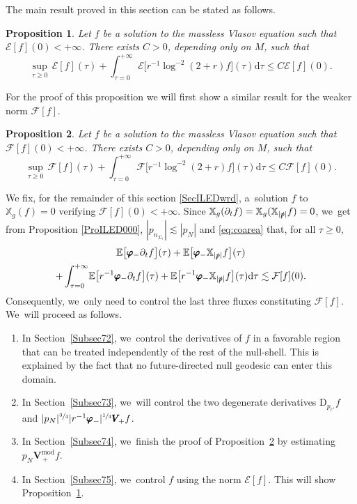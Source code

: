 \documentclass[10pt]{amsart}
\theoremstyle{plain}
\newtheorem{proposition}{Proposition}[section]
\theoremstyle{definition}
\newcommand\T{{\mathbb{X}}}
\newcommand\dr{{\mathrm{d}}}
\begin{document}
The main result proved in this section can be stated as follows.

\begin{proposition}\label{ProILEDwrd2}
Let $f $ be a solution to the massless Vlasov equation such that $\mathcal{E}[f](0) <+ \infty$. There exists $C>0$, depending only on $M$, such that
\[
\sup_{\tau \geq 0} \, \mathcal{E}[f](\tau) +\int_{\tau=0}^{+\infty} \mathcal{E}\bigl[r^{-1}\log^{-2}(2+r)f \bigr](\tau) \dr \tau \leq C \mathcal{E}[f](0).
\]
\end{proposition}

For the proof of this proposition we will first show a similar result for the weaker norm $\mathcal{F}[f]$.

\begin{proposition}\label{ProILEDwrd}
Let $f $ be a solution to the massless Vlasov equation such that $\mathcal{F}[f](0) <+ \infty$. There exists $C>0$, depending only on $M$, such that
\[
\sup_{\tau \geq 0} \, \mathcal{F}[f](\tau) +\int_{\tau=0}^{+\infty} \mathcal{F}\bigl[r^{-1}\log^{-2}(2+r)f \bigr](\tau) \dr \tau \leq C \mathcal{F}[f](0).
\]
\end{proposition}

We fix, for the remainder of this section \ref{SecILEDwrd}, a~solution $f$ to $\T_g(f)=0$ verifying $\mathcal{F}[f](0)<+\infty$. Since $\T_g(\partial_t f)=\T_g(\T_{|\slashed{p}|}f)=0$, we~get from Proposition \ref{ProILED000}, $|p_{n_{\Sigma_\tau}}| \lesssim |p_N|$ and \eqref{eq:coarea} that, for all $\tau \geq 0$,
\begin{multline}\label{kevatalenn:0}
\mathbb{E}\bigl[ \pmb{\varphi}_- \partial_t f \bigr](\tau)+\mathbb{E}\bigl[ \pmb{\varphi}_- \T_{|\slashed{p}|} f \bigr](\tau) \\
+ \int_{\tau=0}^{+\infty} \! \mathbb{E}\bigl[ r^{-1} \pmb{\varphi}_- \partial_t f \bigr](\tau)+\mathbb{E}\bigl[r^{-1} \pmb{\varphi}_- \T_{|\slashed{p}|} f \bigr](\tau) \dr \tau \lesssim \mathcal{F}[f](0).
\end{multline}
Consequently, we~only need to control the last three fluxes constituting $\mathcal{F}[f]$. We~will proceed as follows.
\begin{enumerate}
\item In Section~\ref{Subsec72}, we~control the derivatives of $f$ in a favorable region that can be treated independently of the rest of the null-shell. This is explained by the fact that no future-directed null geodesic can enter this domain.
\item In Section~\ref{Subsec73}, we~will control the two degenerate derivatives $\mathrm{D}_{p_{r^*}} f$ and $ |p_N|^{\sfrac{3}{4}} |r^{-1} \pmb{\varphi}_-|^{\sfrac{1}{4}} \pmb{V}_{\! +} f$.
\item In Section~\ref{Subsec74}, we~finish the proof of Proposition~\ref{ProILEDwrd} by estimating $p_N\pmb{V}_{\, +}^{\mathrm{mod}}f$.
\item In Section~\ref{Subsec75}, we~control $f$ using the norm $\mathcal{E}[f]$. This will show Proposition~\ref{ProILEDwrd2}.
\end{enumerate}
\end{document}
